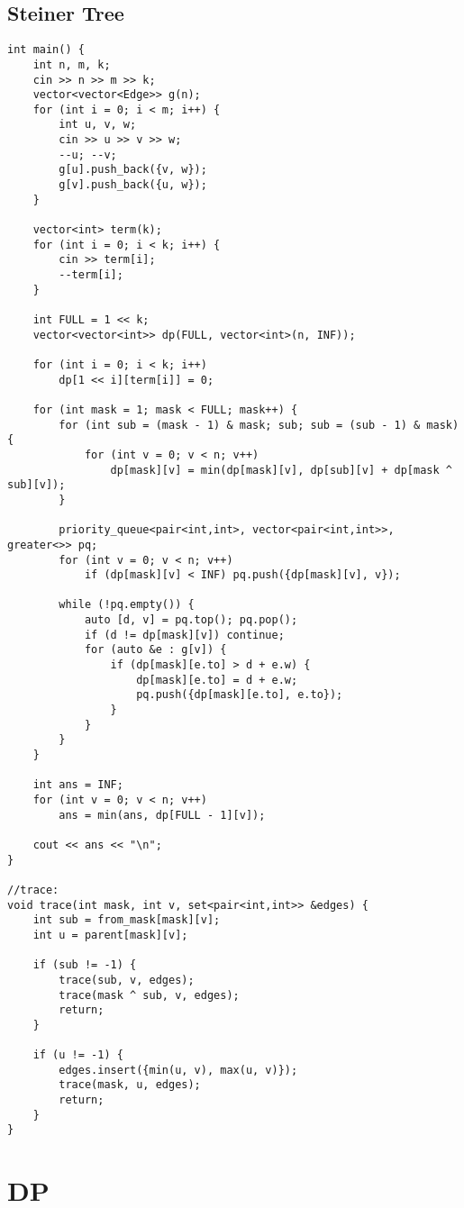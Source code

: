 \documentclass[11pt,a4paper]{article}
\begin{document}
\begin{multicols*}{2}
\subsection{Steiner Tree}
\begin{lstlisting}
int main() {
    int n, m, k;
    cin >> n >> m >> k;
    vector<vector<Edge>> g(n);
    for (int i = 0; i < m; i++) {
        int u, v, w;
        cin >> u >> v >> w;
        --u; --v;
        g[u].push_back({v, w});
        g[v].push_back({u, w});
    }

    vector<int> term(k);
    for (int i = 0; i < k; i++) {
        cin >> term[i];
        --term[i];
    }

    int FULL = 1 << k;
    vector<vector<int>> dp(FULL, vector<int>(n, INF));

    for (int i = 0; i < k; i++)
        dp[1 << i][term[i]] = 0;

    for (int mask = 1; mask < FULL; mask++) {
        for (int sub = (mask - 1) & mask; sub; sub = (sub - 1) & mask) {
            for (int v = 0; v < n; v++)
                dp[mask][v] = min(dp[mask][v], dp[sub][v] + dp[mask ^ sub][v]);
        }

        priority_queue<pair<int,int>, vector<pair<int,int>>, greater<>> pq;
        for (int v = 0; v < n; v++)
            if (dp[mask][v] < INF) pq.push({dp[mask][v], v});

        while (!pq.empty()) {
            auto [d, v] = pq.top(); pq.pop();
            if (d != dp[mask][v]) continue;
            for (auto &e : g[v]) {
                if (dp[mask][e.to] > d + e.w) {
                    dp[mask][e.to] = d + e.w;
                    pq.push({dp[mask][e.to], e.to});
                }
            }
        }
    }

    int ans = INF;
    for (int v = 0; v < n; v++)
        ans = min(ans, dp[FULL - 1][v]);

    cout << ans << "\n";
}

//trace:
void trace(int mask, int v, set<pair<int,int>> &edges) {
    int sub = from_mask[mask][v];
    int u = parent[mask][v];

    if (sub != -1) {
        trace(sub, v, edges);
        trace(mask ^ sub, v, edges);
        return;
    }

    if (u != -1) {
        edges.insert({min(u, v), max(u, v)});
        trace(mask, u, edges);
        return;
    }
}

\end{lstlisting}

\section {DP}

\end{multicols*}
\end{document}
